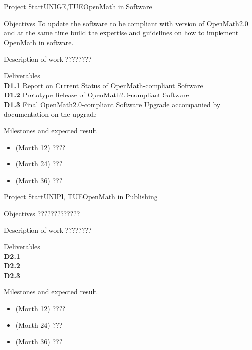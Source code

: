 \documentclass{euproposal}
\begin{document}
\begin{workpackage}{36}{1}{Project Start}{UNIGE,TUE}{OpenMath in Software}
\begin{wpbox}{Objectives}
  To update the software to be compliant with version of OpenMath2.0
  and at the same time build the expertise and guidelines on how to
  implement OpenMath in software.
\end{wpbox}
\begin{wpbox}{Description of work}
  ????????
\end{wpbox}
\begin{wpbox}{Deliverables\\}
  {\bf D1.1} Report on Current Status of OpenMath-compliant Software\\
  {\bf D1.2} Prototype Release of OpenMath2.0-compliant Software\\
  {\bf D1.3} Final OpenMath2.0-compliant Software Upgrade accompanied
  by documentation on the upgrade
\end{wpbox}
\begin{wpbox}{Milestones and expected result}
\begin{itemize}
\item (Month 12) ????
\item (Month 24) ???
\item (Month 36) ???
\end{itemize}
\end{wpbox}
\end{workpackage}
\newpage
\begin{workpackage}{36}{2}{Project Start}{UNIPI, TUE}{OpenMath in Publishing}
\begin{wpbox}{Objectives}
????????????? 
\end{wpbox}
\begin{wpbox}{Description of work}
  ???????? 
\end{wpbox}
\begin{wpbox}{Deliverables\\}
{\bf D2.1} \\
{\bf D2.2} \\
{\bf D2.3} 
\end{wpbox}
\begin{wpbox}{Milestones and expected result}
\begin{itemize}
\item (Month 12) ????
\item (Month 24) ???
\item (Month 36) ???
\end{itemize}
\end{wpbox}
\end{workpackage}
\newpage
\end{document}
